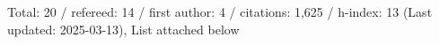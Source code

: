 Total: 20 / refereed: 14 / first author: 4 / citations: 1,625 / h-index: 13 (Last updated: 2025-03-13), List attached below